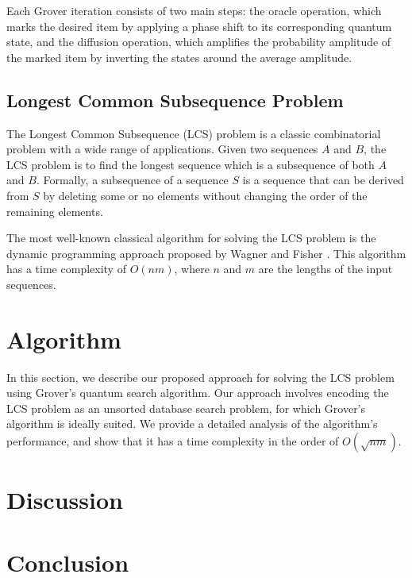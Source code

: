 Each Grover iteration consists of two main steps: the oracle operation, which marks the desired item by applying a phase shift to its corresponding quantum state, and the diffusion operation, which amplifies the probability amplitude of the marked item by inverting the states around the average amplitude.

\subsection{Longest Common Subsequence Problem}

The Longest Common Subsequence (LCS) problem is a classic combinatorial problem with a wide range of applications. Given two sequences $A$ and $B$, the LCS problem is to find the longest sequence which is a subsequence of both $A$ and $B$. Formally, a subsequence of a sequence $S$ is a sequence that can be derived from $S$ by deleting some or no elements without changing the order of the remaining elements.

The most well-known classical algorithm for solving the LCS problem is the dynamic programming approach proposed by Wagner and Fisher \cite{wagner_fisher}. This algorithm has a time complexity of $O(nm)$, where $n$ and $m$ are the lengths of the input sequences.

\section{Algorithm}
\label{sec:algorithm}

In this section, we describe our proposed approach for solving the LCS problem using Grover's quantum search algorithm. Our approach involves encoding the LCS problem as an unsorted database search problem, for which Grover's algorithm is ideally suited. We provide a detailed analysis of the algorithm's performance, and show that it has a time complexity in the order of $O(\sqrt{nm})$.


\section{Discussion}
\label{sec:discussion}


\section{Conclusion}
\label{sec:conclusion}

